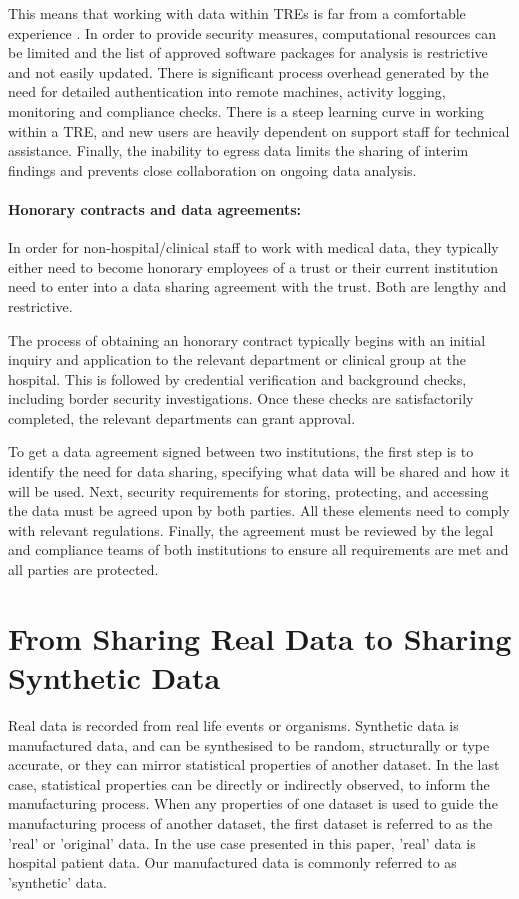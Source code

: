 \documentclass[11pt]{article}
\begin{document}
This means that working with data within TREs is far from a comfortable experience \cite{ODonovan2023}. In order to provide security measures, computational resources can be limited and the list of approved software packages for analysis is restrictive and not easily updated. There is significant process overhead generated by the need for detailed authentication into remote machines, activity logging, monitoring and compliance checks. There is a steep learning curve in working within a TRE, and new users are heavily dependent on support staff for technical assistance. Finally, the inability to egress data limits the sharing of interim findings and prevents close collaboration on ongoing data analysis.

\paragraph{Honorary contracts and data agreements:}

In order for non-hospital/clinical staff to work with medical data, they typically either need to become honorary employees of a trust or their current institution need to enter into a data sharing agreement with the trust. Both are lengthy and restrictive.

The process of obtaining an honorary contract typically begins with an initial inquiry and application to the relevant department or clinical group at the hospital. This is followed by credential verification and background checks, including border security investigations. Once these checks are satisfactorily completed, the relevant departments can grant approval. 

To get a data agreement signed between two institutions, the first step is to identify the need for data sharing, specifying what data will be shared and how it will be used. Next, security requirements for storing, protecting, and accessing the data must be agreed upon by both parties. All these elements need to comply with relevant regulations. Finally, the agreement must be reviewed by the legal and compliance teams of both institutions to ensure all requirements are met and all parties are protected.

\section{From Sharing Real Data to Sharing Synthetic Data}
Real data is recorded from real life events or organisms. Synthetic data is manufactured data, and can be synthesised to be random, structurally or type accurate, or they can mirror statistical properties of another dataset. In the last case, statistical properties can be directly or indirectly observed, to inform the manufacturing process. When any properties of one dataset is used to guide the manufacturing process of another dataset, the first dataset is referred to as the 'real' or 'original' data. In the use case presented in this paper, 'real' data is hospital patient data. Our manufactured data is commonly referred to as 'synthetic' data.
\end{document}
